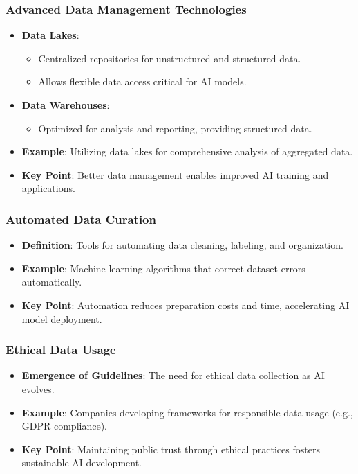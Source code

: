 \documentclass[aspectratio=169]{beamer}
\begin{document}
\begin{frame}[fragile]
    \frametitle{Advanced Data Management Technologies}
    \begin{itemize}
        \item \textbf{Data Lakes}:
            \begin{itemize}
                \item Centralized repositories for unstructured and structured data.
                \item Allows flexible data access critical for AI models.
            \end{itemize}
        \item \textbf{Data Warehouses}:
            \begin{itemize}
                \item Optimized for analysis and reporting, providing structured data.
            \end{itemize}
        \item \textbf{Example}: Utilizing data lakes for comprehensive analysis of aggregated data.
        \item \textbf{Key Point}: Better data management enables improved AI training and applications.
    \end{itemize}
\end{frame}

\begin{frame}[fragile]
    \frametitle{Automated Data Curation}
    \begin{itemize}
        \item \textbf{Definition}: Tools for automating data cleaning, labeling, and organization.
        \item \textbf{Example}: Machine learning algorithms that correct dataset errors automatically.
        \item \textbf{Key Point}: Automation reduces preparation costs and time, accelerating AI model deployment.
    \end{itemize}
\end{frame}

\begin{frame}[fragile]
    \frametitle{Ethical Data Usage}
    \begin{itemize}
        \item \textbf{Emergence of Guidelines}: The need for ethical data collection as AI evolves.
        \item \textbf{Example}: Companies developing frameworks for responsible data usage (e.g., GDPR compliance).
        \item \textbf{Key Point}: Maintaining public trust through ethical practices fosters sustainable AI development.
    \end{itemize}
\end{frame}
\end{document}
